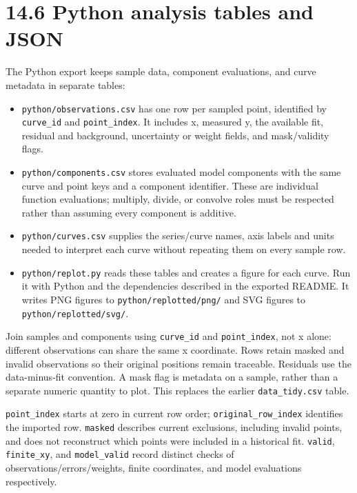 \documentclass[
  10pt,
  a4paper,
  oneside]{scrreprt}
\providecommand{\tightlist}{%
  \setlength{\itemsep}{0pt}\setlength{\parskip}{0pt}}
\begin{document}
\hypertarget{python-analysis-tables-and-json}{%
\section{14.6 Python analysis tables and
JSON}\label{python-analysis-tables-and-json}}

The Python export keeps sample data, component evaluations, and curve
metadata in separate tables:

\begin{itemize}
\tightlist
\item
  \texttt{python/observations.csv} has one row per sampled point,
  identified by \texttt{curve\_id} and \texttt{point\_index}. It
  includes x, measured y, the available fit, residual and background,
  uncertainty or weight fields, and mask/validity flags.
\item
  \texttt{python/components.csv} stores evaluated model components with
  the same curve and point keys and a component identifier. These are
  individual function evaluations; multiply, divide, or convolve roles
  must be respected rather than assuming every component is additive.
\item
  \texttt{python/curves.csv} supplies the series/curve names, axis
  labels and units needed to interpret each curve without repeating them
  on every sample row.
\item
  \texttt{python/replot.py} reads these tables and creates a figure for
  each curve. Run it with Python and the dependencies described in the
  exported README. It writes PNG figures to
  \texttt{python/replotted/png/} and SVG figures to
  \texttt{python/replotted/svg/}.
\end{itemize}

Join samples and components using \texttt{curve\_id} and
\texttt{point\_index}, not x alone: different observations can share the
same x coordinate. Rows retain masked and invalid observations so their
original positions remain traceable. Residuals use the data-minus-fit
convention. A mask flag is metadata on a sample, rather than a separate
numeric quantity to plot. This replaces the earlier
\texttt{data\_tidy.csv} table.

\texttt{point\_index} starts at zero in current row order;
\texttt{original\_row\_index} identifies the imported row.
\texttt{masked} describes current exclusions, including invalid points,
and does not reconstruct which points were included in a historical fit.
\texttt{valid}, \texttt{finite\_xy}, and \texttt{model\_valid} record
distinct checks of observations/errors/weights, finite coordinates, and
model evaluations respectively.
\end{document}

